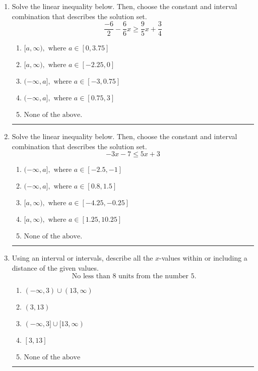 \documentclass[14pt]{extbook}
\newcommand{\litem}[1]{\item#1\hspace*{-1cm}\rule{\textwidth}{0.4pt}}
\begin{document}
\begin{enumerate}
{\begin{enumerate}[label=\Alph*.]
\end{enumerate} }
\litem{
Solve the linear inequality below. Then, choose the constant and interval combination that describes the solution set.\[ \frac{-6}{2} - \frac{6}{6} x \geq \frac{9}{5} x + \frac{3}{4} \]\begin{enumerate}[label=\Alph*.]
\item \( [a, \infty), \text{ where } a \in [0, 3.75] \)
\item \( [a, \infty), \text{ where } a \in [-2.25, 0] \)
\item \( (-\infty, a], \text{ where } a \in [-3, 0.75] \)
\item \( (-\infty, a], \text{ where } a \in [0.75, 3] \)
\item \( \text{None of the above}. \)

\end{enumerate} }
\litem{
Solve the linear inequality below. Then, choose the constant and interval combination that describes the solution set.\[ -3x -7 \leq 5x + 3 \]\begin{enumerate}[label=\Alph*.]
\item \( (-\infty, a], \text{ where } a \in [-2.5, -1] \)
\item \( (-\infty, a], \text{ where } a \in [0.8, 1.5] \)
\item \( [a, \infty), \text{ where } a \in [-4.25, -0.25] \)
\item \( [a, \infty), \text{ where } a \in [1.25, 10.25] \)
\item \( \text{None of the above}. \)

\end{enumerate} }
\litem{
Using an interval or intervals, describe all the $x$-values within or including a distance of the given values.\[ \text{ No less than } 8 \text{ units from the number } 5. \]\begin{enumerate}[label=\Alph*.]
\item \( (-\infty, 3) \cup (13, \infty) \)
\item \( (3, 13) \)
\item \( (-\infty, 3] \cup [13, \infty) \)
\item \( [3, 13] \)
\item \( \text{None of the above} \)


\end{enumerate}}
\end{enumerate}
\end{document}
